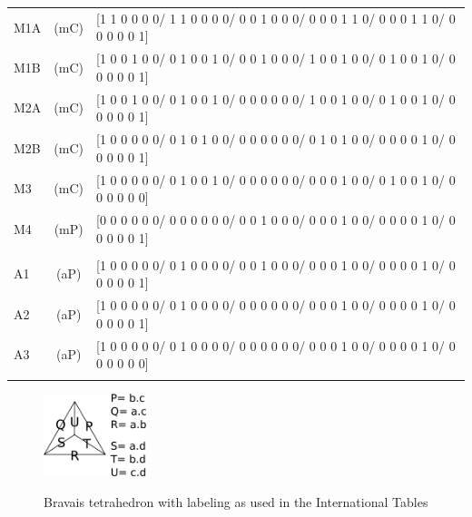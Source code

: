 \documentclass[preprint]{iucr}              %
\begin{document}
{\begin{table}
\begin{tabular}{lcl}
				M1A & (mC) & [1 1 0 0 0 0/  1 1 0 0 0 0/  0 0 1 0 0 0/  0 0 0 1 1 0/  0 0 0 1 1 0/  0 0 0 0 0 1] \\ 
				M1B & (mC) & [1 0 0 1 0 0/  0 1 0 0 1 0/  0 0 1 0 0 0/  1 0 0 1 0 0/  0 1 0 0 1 0/  0 0 0 0 0 1] \\ 
				M2A & (mC) & [1 0 0 1 0 0/  0 1 0 0 1 0/  0 0 0 0 0 0/  1 0 0 1 0 0/  0 1 0 0 1 0/  0 0 0 0 0 1] \\ 
				M2B & (mC) & [1 0 0 0 0 0/  0 1 0 1 0 0/  0 0 0 0 0 0/  0 1 0 1 0 0/  0 0 0 0 1 0/  0 0 0 0 0 1] \\ 
				M3  & (mC) & [1 0 0 0 0 0/  0 1 0 0 1 0/  0 0 0 0 0 0/  0 0 0 1 0 0/  0 1 0 0 1 0/  0 0 0 0 0 0] \\ 
				M4  & (mP) & [0 0 0 0 0 0/  0 0 0 0 0 0/  0 0 1 0 0 0/  0 0 0 1 0 0/  0 0 0 0 1 0/  0 0 0 0 0 1] \\ \\
				
				A1  & (aP) & [1 0 0 0 0 0/  0 1 0 0 0 0/  0 0 1 0 0 0/  0 0 0 1 0 0/  0 0 0 0 1 0/  0 0 0 0 0 1] \\ 
				A2  & (aP) & [1 0 0 0 0 0/  0 1 0 0 0 0/  0 0 0 0 0 0/  0 0 0 1 0 0/  0 0 0 0 1 0/  0 0 0 0 0 1] \\ 
				A3  & (aP) & [1 0 0 0 0 0/  0 1 0 0 0 0/  0 0 0 0 0 0/  0 0 0 1 0 0/  0 0 0 0 1 0/  0 0 0 0 0 0] \\ \\				
				\bottomrule
			\end{tabular}
		\end{table}
	}
	
	
	\begin{figure}
		\caption{Bravais tetrahedron with labeling as used in the International Tables}
		\includegraphics[width=3cm]{PQRSTU}
		\label{fig:PQRSTU}
	\end{figure}
	
\end{document}
